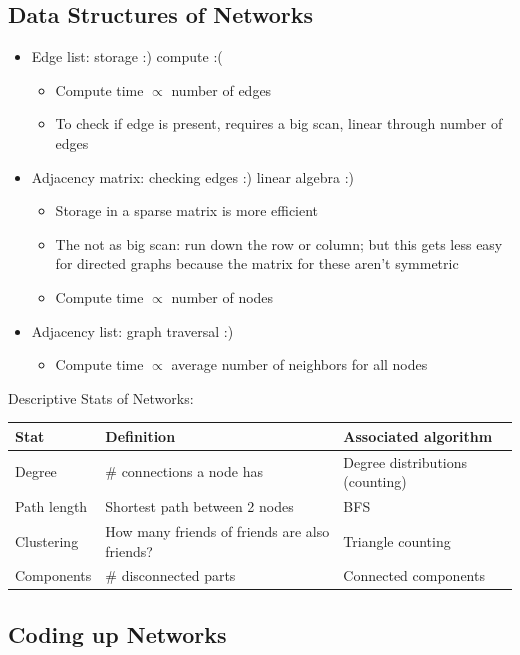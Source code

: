 \subsection{Data Structures of Networks}
\begin{itemize}
	\item Edge list: storage :) compute :(
    	\begin{itemize}
		\item Compute time $\propto$ number of edges     
		\item To check if edge is present, requires a big scan, linear through number of edges
  		\end{itemize} 
    \item Adjacency matrix: checking edges :) linear algebra :) 
    	\begin{itemize}
        \item Storage in a sparse matrix is more efficient
		\item The not as big scan: run down the row or column; but this gets less easy for directed graphs because the matrix for these aren't symmetric
        \item Compute time $\propto$ number of nodes  
  		\end{itemize} 
    \item Adjacency list: graph traversal :) 
    	\begin{itemize}
        \item Compute time $\propto$ average number of neighbors for all nodes
  		\end{itemize}     
\end{itemize}

Descriptive Stats of Networks: 
\begin{center}
    \begin{tabular}{| l | l | l |}
    \hline
    Stat & Definition & Associated algorithm \\ \hline
    Degree & \# connections a node has & Degree distributions (counting) \\ \hline
    Path length & Shortest path between 2 nodes & BFS \\ \hline
    Clustering & How many friends of friends are also friends? & Triangle counting \\ \hline
    Components & \# disconnected parts & Connected components \\
    \hline
    \end{tabular}
\end{center}


\subsection{Coding up Networks}




